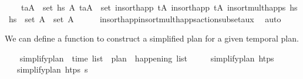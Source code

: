 \begin{isabellebody}
\ \ \ \ {\isachardoublequoteopen}{\isasymforall}{\isacharparenleft}{\kern0pt}t\isactrlsub a{\isacharcomma}{\kern0pt}A{\isacharparenright}{\kern0pt}\ {\isasymin}\ set\ hs\ {\isasymexists}A{\isacharprime}{\kern0pt}{\isachardot}{\kern0pt}\ {\isacharparenleft}{\kern0pt}t\isactrlsub a{\isacharcomma}{\kern0pt}A{\isacharprime}{\kern0pt}{\isacharparenright}{\kern0pt}\ {\isasymin}\ set\ {\isacharparenleft}{\kern0pt}insort{\isacharunderscore}{\kern0pt}happ\ {\isacharparenleft}{\kern0pt}tA\ {\isacharparenleft}{\kern0pt}insort{\isacharunderscore}{\kern0pt}happ\ {\isacharparenleft}{\kern0pt}tA\ {\isacharparenleft}{\kern0pt}insort{\isacharunderscore}{\kern0pt}mult{\isacharunderscore}{\kern0pt}happs\ hs\ hs\ {\isasymand}\ set\ A\ {\isasymsubseteq}\ set\ A{\isacharprime}{\kern0pt}{\isachardoublequoteclose}\isanewline
%
\isadelimproof
\ \ \ \ %
\endisadelimproof
%
\isatagproof
{}\isamarkupfalse%
\ insort{\isacharunderscore}{\kern0pt}happ{}{\isacharunderscore}{\kern0pt}insort{\isacharunderscore}{\kern0pt}mult{\isacharunderscore}{\kern0pt}happs{\isacharunderscore}{\kern0pt}action{\isacharunderscore}{\kern0pt}subset{\isacharunderscore}{\kern0pt}aux\ \isamarkupfalse%
\ auto%
\endisatagproof
{\isafoldproof}%
%
\isadelimproof
%
\endisadelimproof
%
\begin{isamarkuptext}%
We can define a function to construct a simplified plan for a given temporal plan.%
\end{isamarkuptext}\isamarkuptrue%
\ \ \isamarkupfalse%
\ simplify{\isacharunderscore}{\kern0pt}plan\ {\isacharcolon}{\kern0pt}{\isacharcolon}{\kern0pt}\ {\isachardoublequoteopen}time\ list\ {\isasymRightarrow}\ plan\ {\isasymRightarrow}\ happening\ list{\isachardoublequoteclose}\ \isanewline
\ \ \ \ {\isachardoublequoteopen}simplify{\isacharunderscore}{\kern0pt}plan\ htps\ {\isacharbrackleft}{\kern0pt}{\isacharbrackright}{\kern0pt}\ {\isacharequal}{\kern0pt}\ {\isacharbrackleft}{\kern0pt}{\isacharbrackright}{\kern0pt}{\isachardoublequoteclose}\isanewline
\ \ {\isacharbar}{\kern0pt}\ {\isachardoublequoteopen}simplify{\isacharunderscore}{\kern0pt}plan\ htps\ {\isacharparenleft}{\kern0pt}{\isasympi}{\isacharhash}{\kern0pt}{\isasympi}s{\isacharparenright}{\kern0pt}\ {\isacharequal}{\kern0pt}\ \isanewline

\end{isabellebody}
